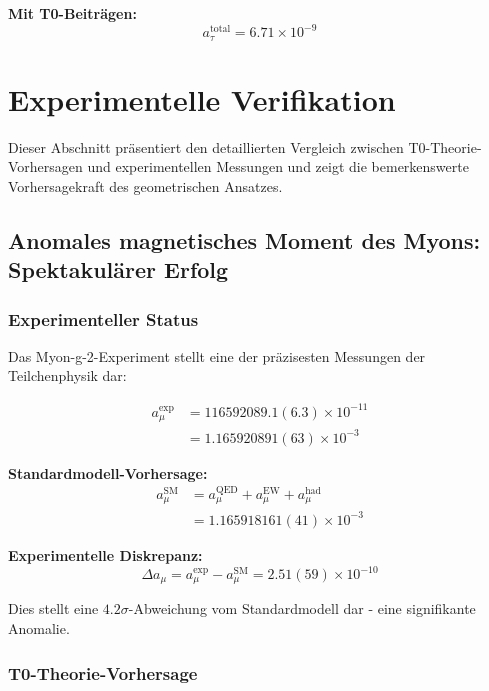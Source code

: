 \documentclass[12pt,a4paper]{article}
\numberwithin{equation}{section}
\begin{document}
	\textbf{Mit T0-Beiträgen:}
	\begin{equation}
		a_\tau^{\text{total}} = 6.71 \times 10^{-9}
		\label{eq:tau_total}
	\end{equation}
	
	\section{Experimentelle Verifikation}
	
	Dieser Abschnitt präsentiert den detaillierten Vergleich zwischen T0-Theorie-Vorhersagen und experimentellen Messungen und zeigt die bemerkenswerte Vorhersagekraft des geometrischen Ansatzes.
	
	\subsection{Anomales magnetisches Moment des Myons: Spektakulärer Erfolg}
	
	\subsubsection{Experimenteller Status}
	
	Das Myon-g-2-Experiment stellt eine der präzisesten Messungen der Teilchenphysik dar:
	
	\begin{align}
		a_\mu^{\exp} &= 116592089.1(6.3) \times 10^{-11} \\
		&= 1.165920891(63) \times 10^{-3}
		\label{eq:muon_exp_precise}
	\end{align}
	
	\textbf{Standardmodell-Vorhersage:}
	\begin{align}
		a_\mu^{\text{SM}} &= a_\mu^{\text{QED}} + a_\mu^{\text{EW}} + a_\mu^{\text{had}} \\
		&= 1.165918161(41) \times 10^{-3}
		\label{eq:muon_sm_prediction}
	\end{align}
	
	\textbf{Experimentelle Diskrepanz:}
	\begin{equation}
		\Delta a_\mu = a_\mu^{\exp} - a_\mu^{\text{SM}} = 2.51(59) \times 10^{-10}
		\label{eq:muon_discrepancy}
	\end{equation}
	
	Dies stellt eine $4.2\sigma$-Abweichung vom Standardmodell dar - eine signifikante Anomalie.
	
	\subsubsection{T0-Theorie-Vorhersage}
	
\end{document}
